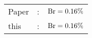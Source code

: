       \begin{tabular}{lcr}
          Paper &:& $\mathrm{Br}  = 0.16\%$ \\
          this      &:& $\mathrm{Br}  = 0.16\%$ \\        
      \end{tabular}

